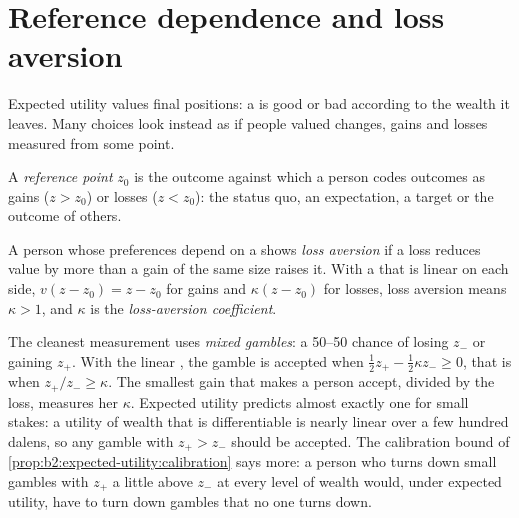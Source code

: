 \section{Reference dependence and loss aversion}\label{sec:b2:behavioural-evidence:loss-aversion}

Expected utility values final positions: a  is good or bad according to the wealth it leaves.
Many choices look instead as if people valued changes, gains and losses measured from some point.

\begin{definition}\label{def:b2:behavioural-evidence:reference-point}
A \emph{reference point} $z_0$ is the outcome against which a person codes
outcomes as gains ($z > z_0$) or losses ($z < z_0$): the status quo, an expectation, a target or the
outcome of others.
\end{definition}

\begin{definition}\label{def:b2:behavioural-evidence:loss-aversion}
A person whose preferences depend on a  shows \emph{loss aversion}
if a loss reduces value by more than a gain of the same size raises it. With a  that is
linear on each side, $v(z - z_0) = z - z_0$ for gains and $\kappa(z - z_0)$ for losses, loss aversion
means $\kappa > 1$, and $\kappa$ is the \emph{loss-aversion coefficient}.
\end{definition}

The cleanest measurement uses \emph{mixed gambles}: a 50--50 chance of losing $z_-$ or gaining $z_+$. With
the linear , the gamble is accepted when $\tfrac12 z_+ - \tfrac12\kappa z_- \ge 0$, that
is when $z_+/z_- \ge \kappa$. The smallest gain that makes a person accept, divided by the loss, measures
her $\kappa$. Expected utility predicts almost exactly one for small stakes: a utility of wealth that is
differentiable is nearly linear over a few hundred dalens, so any gamble with $z_+ > z_-$ should be
accepted. The calibration bound of \cref{prop:b2:expected-utility:calibration} says more: a person who
turns down small gambles with $z_+$ a little above $z_-$ at every level of wealth would, under expected
utility, have to turn down gambles that no one turns down.


